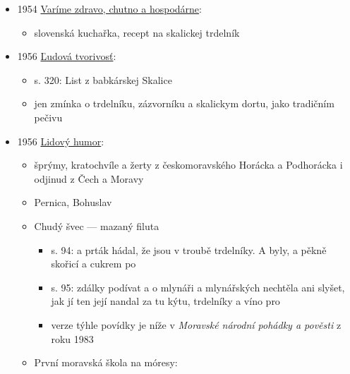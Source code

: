 \begin{itemize}
\begin{itemize}
    \begin{itemize}
    \tightlist
    \item
      heslo pro trdlo: Dial. dřevěný rožeň k pečení trdelníků. Na trdle
      se pekly trdelníky. Lid. nov. Potom na valadli se těsto {[}na
      trdelníky{]} náválí, natočí na horký, dřevěný trdlo, pomastí
      vejcem. Šeb.
    \item
      heslo pro trdlovec: m. kuch. věžovité pečivo z nejjemnější mouky,
      másla, cukru, mandlí, žloutků a vajec, které se leje na otáčející
      se rožeň.
    \end{itemize}
  \end{itemize}
\item
  1954
  \href{https://dikda.snk.sk/uuid/uuid:38df4d2e-5eea-4484-9e22-e5a1080ba4e3}{Varíme
  zdravo, chutno a hospodárne}:

  \begin{itemize}
  \tightlist
  \item
    slovenská kuchařka, recept na skalickej trdelník
  \end{itemize}
\item
  1956
  \href{https://dikda.snk.sk/uuid/uuid:906d894f-daa0-4fa8-9756-804e856a0d44}{Ľudová
  tvorivosť}:

  \begin{itemize}
  \tightlist
  \item
    s. 320: List z babkárskej Skalice
  \item
    jen zmínka o trdelníku, zázvorníku a skalickym dortu, jako tradičním
    pečivu
  \end{itemize}
\item
  1956
  \href{https://www.digitalniknihovna.cz/kkvhb/uuid/uuid:6b24ac2d-3df8-49fe-94e6-08c0ac91a5af}{Lidový
  humor}:

  \begin{itemize}
  \tightlist
  \item
    šprýmy, kratochvíle a žerty z českomoravského Horácka a Podhorácka i
    odjinud z Čech a Moravy
  \item
    Pernica, Bohuslav
  \item
    Chudý švec --- mazaný filuta

    \begin{itemize}
    \tightlist
    \item
      s. 94: a prták hádal, že jsou v troubě trdelníky. A byly, a pěkně
      skořicí a cukrem po
    \item
      s. 95: zdálky podívat a o mlynáři a mlynářských nechtěla ani
      slyšet, jak jí ten její nandal za tu kýtu, trdelníky a víno pro
    \item
      verze týhle povídky je níže v \emph{Moravské národní pohádky a
      pověsti} z roku 1983
    \end{itemize}
  \item
    První moravská škola na móresy:


\end{itemize}
\end{itemize}
